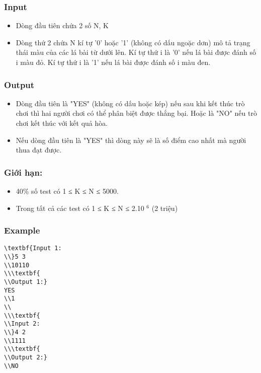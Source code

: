 \subsubsection{   Input  }
\begin{itemize}
	\item     Dòng đầu tiên chứa 2 số N, K   
	\item     Dòng thứ 2 chứa N kí tự '0' hoặc '1' (không có dấu ngoặc dơn) mô tả trạng thái màu của các lá bài từ dưới lên. Kí tự thứ i là '0' nếu lá bài được đánh số i màu đỏ. Kí tự thứ i là '1' nếu lá bài được đánh số i màu đen.   
\end{itemize}

\subsubsection{   Output  }
\begin{itemize}
	\item     Dòng đầu tiên là "YES" (không có dấu hoặc kép) nếu sau khi kết thúc trò chơi thì hai người chơi có thể phân biệt được thắng bại. Hoặc là "NO" nếu trò chơi kết thúc với kết quả hòa.   
	\item     Nếu dòng đầu tiên là "YES" thì dòng này sẽ là số điểm cao nhất mà người         thua        đạt được.   
\end{itemize}

\subsubsection{   Giới hạn:  }
\begin{itemize}
	\item     40\% số test có 1 ≤ K ≤ N ≤ 5000.   
	\item     Trong tất cả các test có 1 ≤ K ≤ N ≤ 2.10    $^     6    $    (2 triệu)   
\end{itemize}
\begin{itemize}
\end{itemize}

\subsubsection{   Example  }
\begin{verbatim}
\textbf{Input 1:
\\}5 3
\\10110
\\\textbf{
\\Output 1:}
YES
\\1
\\
\\\textbf{
\\Input 2:
\\}4 2
\\1111
\\\textbf{
\\Output 2:}
\\NO\end{verbatim}

